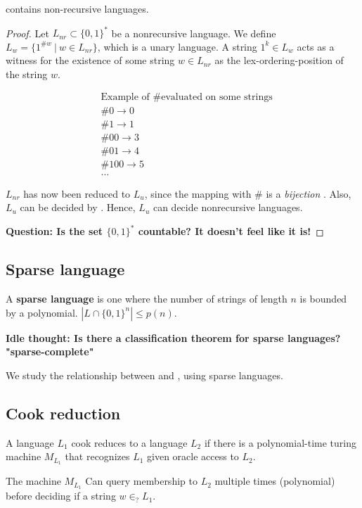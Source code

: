 \begin{theorem}
\ppoly contains non-recursive languages.
\end{theorem}
\begin{proof}
Let $L_{nr} \subset \{0, 1\}^*$ be a nonrecursive language. 
We define $L_w = \{ 1^{\#w}~\vert~w \in L_{nr} \}$,
which is a unary language. A string $1^k \in L_w$ acts as a witness for the
existence of some string $w \in L_{nr}$ as the lex-ordering-position of the string
$w$.

\begin{align*}
&\text{Example of \# evaluated on some strings}\\
&\#0 \to 0 \\
&\#1 \to 1 \\
&\#00 \to 3 \\
&\#01 \to 4 \\
&\#100 \to 5 \\
&\dots
\end{align*}

$L_{nr}$ has now been reduced to $L_u$, since the mapping with $\#$ is a 
\textit{bijection} . Also, $L_u$ can be decided by \ppoly. Hence,
$L_u$ can decide nonrecursive languages.

\textbf{Question: Is the set $\{0, 1\}^*$ countable? It doesn't feel like it is!}
\end{proof}


\subsection{Sparse language}
A \textbf{sparse language} is one where the number of strings of length $n$
is bounded by a polynomial. $|L \cap \{0, 1\}^n| \leq p(n)$.

\textbf{Idle thought: Is there a classification theorem for sparse languages? "sparse-complete"}

We study the relationship between \nptime and \ppoly, using sparse languages.

\subsection{Cook reduction}
A language $L_1$ cook reduces to a language $L_2$ if there is a 
polynomial-time turing machine $M_{L_1}$ that recognizes $L_1$ given oracle
access to $L_2$.

The machine $M_{L_1}$ Can query membership to $L_2$ multiple times (polynomial)
before deciding if a string $w \in_? L_1$.

